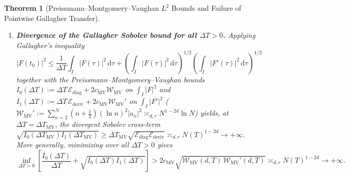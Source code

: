 \documentclass[11pt,reqno]{amsart}
\newtheorem{theorem}{Theorem}[section]
\theoremstyle{definition}
\theoremstyle{remark}
\numberwithin{equation}{section}
\newcommand{\dd}{\,\mathrm{d}}
\begin{document}
\begin{theorem}[Preissmann--Montgomery--Vaughan $L^2$ Bounds and Failure of Pointwise Gallagher Transfer]
\begin{enumerate}[label=\textup{(\roman*)},leftmargin=2.2em]
\item \textbf{Divergence of the Gallagher Sobolev bound for all $\Delta T > 0$.} Applying Gallagher's inequality~\cite{gallagher1970}
\begin{equation}\label{eq:gallagher_ineq}
\bigl\lvert F(t_0)\bigr\rvert^2 \le \frac{1}{\Delta T}\int_{I} \bigl\lvert F(\tau)\bigr\rvert^2\dd\tau + \left(\int_{I} \bigl\lvert F(\tau)\bigr\rvert^2\dd\tau\right)^{1/2}\left(\int_{I} \bigl\lvert F'(\tau)\bigr\rvert^2\dd\tau\right)^{1/2}
\end{equation}
together with the Preissmann--Montgomery--Vaughan bounds $I_0(\Delta T) := \Delta T\,\mathcal{E}_{\mathrm{diag}} + 2c_{\mathrm{MV}}\mathcal{W}_{\mathrm{MV}}$ on $\int_I \lvert F\rvert^2$ and $I_1(\Delta T) := \Delta T\,\mathcal{E}_{\mathrm{deriv}} + 2c_{\mathrm{MV}}\mathcal{W}_{\mathrm{MV}}'$ on $\int_I \lvert F'\rvert^2$ ($\mathcal{W}_{\mathrm{MV}}' := \sum_{n=2}^N (n + \frac{1}{2})(\ln n)^2\lvert a_n\rvert^2 \asymp_{d,r} N^{1-2d}\ln N$) yields, at $\Delta T = \Delta T_{\mathrm{MV}}$, the divergent Sobolev cross-term $\sqrt{I_0(\Delta T_{\mathrm{MV}})I_1(\Delta T_{\mathrm{MV}})} \ge \Delta T_{\mathrm{MV}}\sqrt{\mathcal{E}_{\mathrm{diag}}\mathcal{E}_{\mathrm{deriv}}} \asymp_{d,r} N(T)^{1-2d} \to +\infty$. More generally, minimizing over \emph{all} $\Delta T > 0$ gives
\begin{equation}\label{eq:gallagher_min}
\inf_{\Delta T > 0}\left[\frac{I_0(\Delta T)}{\Delta T} + \sqrt{I_0(\Delta T)I_1(\Delta T)}\right] > 2c_{\mathrm{MV}}\sqrt{\mathcal{W}_{\mathrm{MV}}(d,T)\,\mathcal{W}_{\mathrm{MV}}'(d,T)} \asymp_{d,r} N(T)^{1-2d} \longrightarrow +\infty.
\end{equation}
\end{enumerate}
\end{theorem}
\end{document}
